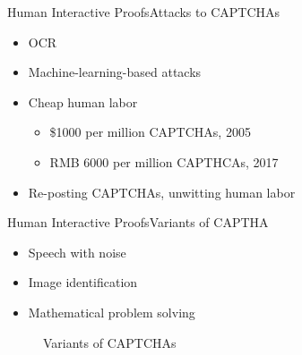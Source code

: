 \documentclass{beamer}
\begin{document}
  \begin{frame}{Human Interactive Proofs}{Attacks to CAPTCHAs}
    \begin{itemize}[<+->]
      \item OCR
      \item Machine-learning-based attacks
      \item Cheap human labor
      \begin{itemize}
        \item \$1000 per million CAPTCHAs, 2005
        \item RMB 6000 per million CAPTHCAs, 2017
      \end{itemize}
      \item Re-posting CAPTCHAs, unwitting human labor
    \end{itemize}
  \end{frame}

  \begin{frame}{Human Interactive Proofs}{Variants of CAPTHA}
    \begin{itemize}
      \item Speech with noise
      \item Image identification
      \item Mathematical problem solving
    \end{itemize}
    \pause
    \begin{figure}
      \caption{Variants of CAPTCHAs}
    \end{figure}
  \end{frame}
\end{document}
